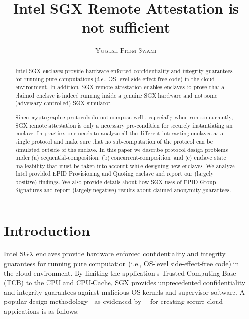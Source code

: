 \documentclass[letterpaper]{article}
\title{\bf Intel SGX Remote Attestation is not sufficient}
\author{\textsc{Yogesh Prem Swami}}
\date{\lastupdate}
\newcommand{\ie}{\textit{i.e.}}
\begin{document}

\maketitle

\begin{abstract}
  Intel SGX enclaves provide hardware enforced confidentiality and
  integrity guarantees for running pure computations (\ie, OS-level
  side-effect-free code) in the cloud environment. In addition, SGX
  remote attestation enables enclaves to prove that a claimed enclave
  is indeed running inside a genuine SGX hardware and not some
  (adversary controlled) SGX simulator.

  Since cryptographic protocols do not compose well
  \cite{cramerthesis,ucframework,gnuc}, especially when run
  concurrently, SGX remote attestation is only a necessary
  pre-condition for securely instantiating an enclave. In practice,
  one needs to analyze all the different interacting enclaves as a
  single protocol and make sure that no sub-computation of the
  protocol can be simulated outside of the enclave. In this paper we
  describe protocol design problems under (a) sequential-composition,
  (b) concurrent-composition, and (c) enclave state malleability that
  must be taken into account while designing new enclaves. We analyze
  Intel provided EPID \cite{epid} \textsf{Provisioning} and
  \textsf{Quoting} enclave \cite{sgxattest} and report our (largely
  positive) findings. We also provide details about how SGX uses of
  EPID Group Signatures and report (largely negative) results about
  claimed anonymity guarantees.

\end{abstract}

\section{Introduction}
\label{sec:intro}
  Intel SGX enclaves\cite{sgxinnov, sgxinnov2} provide hardware
  enforced confidentiality and integrity guarantees for running pure
  computation (i.e., OS-level side-effect-free code) in the
  cloud environment. By limiting the application's Trusted Computing
  Base (TCB) to the CPU and CPU-Cache, SGX provides unprecedented
  confidentiality and integrity guarantees against malicious OS
  kernels and supervisor software. A popular design methodology---as
  evidenced by \cite{Haven, Graphene, Scone}---for creating secure
  cloud applications is as follows:
\end{document}
